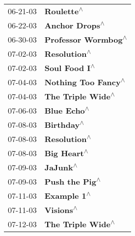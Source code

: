 \begin{supertabular}{p{0.25\columnwidth}p{0.75\columnwidth}}
 06-21-03 &                                                                 \textbf{Roulette\textsuperscript{$\wedge$}} \\
 06-22-03 &                                                             \textbf{Anchor Drops\textsuperscript{$\wedge$}} \\
 06-30-03 &                                                        \textbf{Professor Wormbog\textsuperscript{$\wedge$}} \\
 07-02-03 &                                                               \textbf{Resolution\textsuperscript{$\wedge$}} \\
 07-02-03 &                                                              \textbf{Soul Food I\textsuperscript{$\wedge$}} \\
 07-04-03 &                                                        \textbf{Nothing Too Fancy\textsuperscript{$\wedge$}} \\
 07-04-03 &                                                          \textbf{The Triple Wide\textsuperscript{$\wedge$}} \\
 07-06-03 &                                                                \textbf{Blue Echo\textsuperscript{$\wedge$}} \\
 07-08-03 &                                                                 \textbf{Birthday\textsuperscript{$\wedge$}} \\
 07-08-03 &                                                               \textbf{Resolution\textsuperscript{$\wedge$}} \\
 07-08-03 &                                                                \textbf{Big Heart\textsuperscript{$\wedge$}} \\
 07-09-03 &                                                                   \textbf{JaJunk\textsuperscript{$\wedge$}} \\
 07-09-03 &                                                             \textbf{Push the Pig\textsuperscript{$\wedge$}} \\
 07-11-03 &                                                                \textbf{Example 1\textsuperscript{$\wedge$}} \\
 07-11-03 &                                                                  \textbf{Visions\textsuperscript{$\wedge$}} \\
 07-12-03 &                                                          \textbf{The Triple Wide\textsuperscript{$\wedge$}} \\

\end{supertabular}
